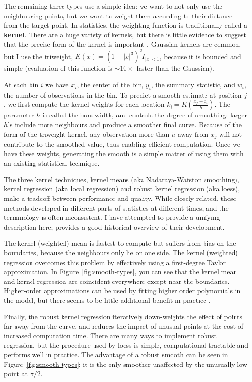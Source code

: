 \documentclass[journal]{vgtc}                %
\begin{document}
The remaining three types use a simple idea: we want to not only use the neighbouring points, but we want to weight them according to their distance from the target point. In statistics, the weighting function is traditionally called a {\bf kernel}. There are a huge variety of kernels, but there is little evidence to suggest that the precise form of the kernel is important \citep{cleveland:1996}. Gaussian kernels are common, but I use the triweight, $K(x) = (1 - |x|^3)^2 I_{|x| < 1}$, because it is bounded and simple (evaluation of this function is $\sim 10 \times$ faster than the Gaussian).  

At each bin $i$ we have $x_i$, the center of the bin, $y_i$, the summary statistic, and $w_i$, the number of observations in the bin. To predict a smooth estimate at position $j$, we first compute the kernel weights for each location $k_i = K(\frac{x_j - x_i}{h})$. The parameter $h$ is called the bandwidth, and controls the degree of smoothing: larger $h$'s include more neighbours and produce a smoother final curve. Because of the form of the triweight kernel, any observation more than $h$ away from $x_j$ will not contribute to the smoothed value, thus enabling efficient computation.  Once we have these weights, generating the smooth is a simple matter of using them with an existing statistical technique.

The three kernel techniques, kernel means (aka Nadaraya-Watston smoothing), kernel regression (aka local regression) and robust kernel regression (aka loess), make a tradeoff between performance and quality. While closely related, these methods developed in different parts of statistics at different times, and the terminology is often inconsistent. I have attempted to provide a unifying description here; \citep{cleveland:1996} provides a good historical overview of their development.

The kernel (weighted) mean is fastest to compute but suffers from bias on the boundaries, because the neighbours only lie on one side. The kernel (weighted) regression overcomes this problem by effectively using a first-degree Taylor approximation. In Figure~\ref{fig:smooth-types}, you can see that the kernel mean and kernel regression are coincident everywhere except near the boundaries. Higher-order approximations can be used by fitting higher order polynomials in the model, but there seems to be little additional benefit in practice \citep{cleveland:1996}.

Finally, the robust kernel regression iteratively down-weights the effect of points far away from the curve, and reduces the impact of unusual points at the cost of increased computation time. There are many ways to implement robust regression, but the procedure used by loess \citep{cleveland:1979} is simple, computational tractable and performs well in practice. The advantage of a robust smooth can be seen in Figure~\ref{fig:smooth-types}: it is the only smoother unaffected by the unusually low point at $\pi / 2$.
\end{document}
